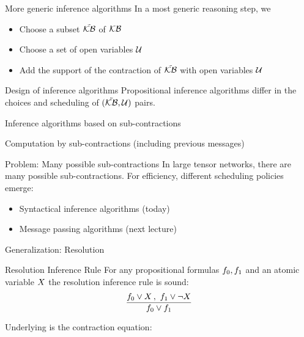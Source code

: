 \documentclass{beamer}
\begin{document}
    \begin{frame}{More generic inference algorithms}
        In a most generic reasoning step, we
        \begin{itemize}
            \item Choose a subset $\tilde{\mathcal{KB}}$ of $\mathcal{KB}$
            \item Choose a set of open variables $\mathcal{U}$
            \item Add the support of the contraction of $\tilde{\mathcal{KB}}$ with open variables $\mathcal{U}$
        \end{itemize}

        \begin{block}{Design of inference algorithms}
            Propositional inference algorithms differ in the choices and scheduling of $(\tilde{\mathcal{KB}},\mathcal{U})$ pairs.
        \end{block}
    \end{frame}


    \begin{frame}{Inference algorithms based on sub-contractions}


        Computation by sub-contractions (including previous messages)

        \begin{block}{Problem: Many possible sub-contractions}
            In large tensor networks, there are many possible sub-contractions.
            For efficiency, different scheduling policies emerge:
            \begin{itemize}
                \item Syntactical inference algorithms (today)
                \item Message passing algorithms (next lecture)
            \end{itemize}
        \end{block}

    \end{frame}


    \begin{frame}{Generalization: Resolution}
        \begin{block}{Resolution Inference Rule}
            For any propositional formulas $f_{0},f_{1}$ and an atomic variable $X$ the resolution inference rule is sound:
            \begin{align*}
                \frac{
                    f_{0} \lor X \,,\,\, f_{1} \lor \lnot X
                }{
                    f_{0} \lor f_{1}
                }
            \end{align*}
        \end{block}

        Underlying is the contraction equation:
        
    \end{frame}
\end{document}
